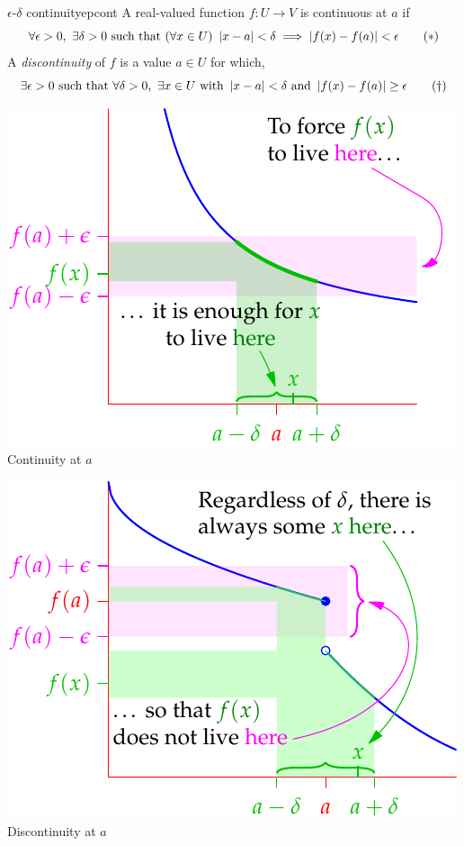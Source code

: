 \begin{defn}{$\epsilon$-$\delta$ continuity}{epcont}
	A real-valued function $f:U\to V$ is continuous at $a$ if\footnotemark{}
	\[
		\forall\epsilon>0,\ \exists\delta>0
		\text{ such that }(\forall x\in U)\ 
		\nm{x-a}<\delta\implies\nm{f(x)-f(a)}<\epsilon
		\tag{$\ast$}
	\]
	A \emph{discontinuity} of $f$ is a value $a\in U$ for which,
	\[
		\exists\epsilon>0\ \text{such that}\ 
		\forall\delta>0,\ \exists x\in U\ \text{with }
		\nm{x-a}<\delta\ \text{and}\ \nm{f(x)-f(a)}\ge\epsilon
		\tag{$\dag$}
	\]
	
	\begin{minipage}[t]{0.49\linewidth}\vspace{-12pt}
		\centering
		\includegraphics[scale=0.95]{contdef-pic5}\\
		Continuity at $a$
	\end{minipage}
	\hfill
	\begin{minipage}[t]{0.49\linewidth}\vspace{-12pt}
		\centering
		\includegraphics[scale=0.95]{contdef-pic3}\\
		Discontinuity at $a$
	\end{minipage}
\end{defn}

